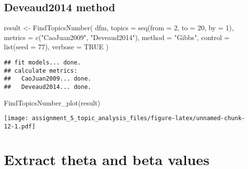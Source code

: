\documentclass[
]{article}
\newenvironment{Shaded}{\begin{snugshade}}{\end{snugshade}}
\newcommand{\AttributeTok}[1]{\textcolor[rgb]{0.77,0.63,0.00}{#1}}
\newcommand{\ConstantTok}[1]{\textcolor[rgb]{0.00,0.00,0.00}{#1}}
\newcommand{\DecValTok}[1]{\textcolor[rgb]{0.00,0.00,0.81}{#1}}
\newcommand{\FunctionTok}[1]{\textcolor[rgb]{0.00,0.00,0.00}{#1}}
\newcommand{\NormalTok}[1]{#1}
\newcommand{\OtherTok}[1]{\textcolor[rgb]{0.56,0.35,0.01}{#1}}
\newcommand{\SpecialCharTok}[1]{\textcolor[rgb]{0.00,0.00,0.00}{#1}}
\newcommand{\StringTok}[1]{\textcolor[rgb]{0.31,0.60,0.02}{#1}}
\begin{document}
\hypertarget{deveaud2014-method}{%
\subsection{Deveaud2014 method}\label{deveaud2014-method}}

\begin{Shaded}
\begin{Highlighting}[]
\NormalTok{result }\OtherTok{\textless{}{-}} \FunctionTok{FindTopicsNumber}\NormalTok{(}
\NormalTok{  dfm,}
  \AttributeTok{topics =} \FunctionTok{seq}\NormalTok{(}\AttributeTok{from =} \DecValTok{2}\NormalTok{, }\AttributeTok{to =} \DecValTok{20}\NormalTok{, }\AttributeTok{by =} \DecValTok{1}\NormalTok{),}
  \AttributeTok{metrics =} \FunctionTok{c}\NormalTok{(}\StringTok{"CaoJuan2009"}\NormalTok{, }\StringTok{"Deveaud2014"}\NormalTok{),}
  \AttributeTok{method =} \StringTok{"Gibbs"}\NormalTok{,}
  \AttributeTok{control =} \FunctionTok{list}\NormalTok{(}\AttributeTok{seed =} \DecValTok{77}\NormalTok{),}
  \AttributeTok{verbose =} \ConstantTok{TRUE}
\NormalTok{)}
\end{Highlighting}
\end{Shaded}

\begin{verbatim}
## fit models... done.
## calculate metrics:
##   CaoJuan2009... done.
##   Deveaud2014... done.
\end{verbatim}

\begin{Shaded}
\begin{Highlighting}[]
\FunctionTok{FindTopicsNumber\_plot}\NormalTok{(result)}
\end{Highlighting}
\end{Shaded}

\texttt{[image: assignment\_5\_topic\_analysis\_files/figure-latex/unnamed-chunk-12-1.pdf]}

\hypertarget{extract-theta-and-beta-values}{%
\section{Extract theta and beta
values}\label{extract-theta-and-beta-values}}

\begin{Shaded}
\end{Shaded}
\end{document}
